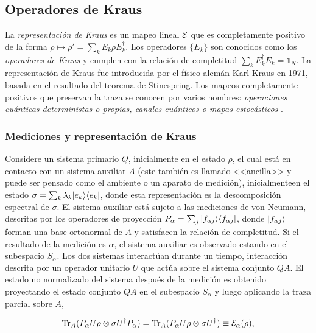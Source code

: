 \subsection{Operadores de Kraus}

 La \textit{representación de Kraus} es un mapeo lineal $\mathcal{E}$ que es completamente positivo de la forma $\rho \mapsto \rho'=\sum_k E_k\rho E_k^\dagger$. Los operadores $\{E_k\}$ son conocidos como los \textit{operadores de Kraus} y cumplen con la relación de completitud $\sum_k E_k^\dagger E_k=\mathds{1}_N$. La representación de Kraus fue introducida por el físico alemán Karl Kraus en 1971, basada en el resultado del teorema de Stinespring. Los mapeos completamente positivos que preservan la traza se conocen por varios nombres: \textit{operaciones cuánticas deterministas o propias, canales cuánticos o mapas estocásticos} {\cite{2007geometry}}.


\subsubsection{Mediciones y representación de Kraus}\label{Medicion_RepresentacionDeKraus}

Considere un sistema primario $Q$, inicialmente en el estado $\rho$,  el cual está en contacto con un sistema auxiliar $A$ (este también es llamado <<ancilla>> y puede ser pensado como el ambiente o un aparato de medición), inicialmenteen el estado $\sigma=\sum_k \lambda_k |e_k\rangle \langle e_k|$, donde esta representación es la descomposición espectral de $\sigma$. El sistema auxiliar está sujeto a las mediciones de von Neumann, descritas por los operadores de proyección $P_\alpha=\sum_j |f_{\alpha j}\rangle \langle f_{\alpha j}|$,  donde $|f_{\alpha j}\rangle$ forman una base ortonormal de $A$ y satisfacen la relación de completitud. Si el resultado de la medición es $\alpha$, el sistema auxiliar es observado estando en el subespacio $S_\alpha$. Los dos sistemas interactúan durante un tiempo, interacción descrita por un operador unitario $U$ que actúa sobre el sistema conjunto $QA$. El estado no normalizado del sistema después de la medición es obtenido proyectando el estado conjunto $QA$ en el subespacio $S_\alpha$ y luego aplicando la traza parcial sobre $A$,

\begin{equation}\label{measurement_model}
    {\rm Tr}_A(P_\alpha U \rho \otimes \sigma U^\dagger P_\alpha)= {\rm Tr}_A(P_\alpha U \rho \otimes \sigma U^\dagger)\equiv \mathcal{E}_\alpha(\rho),
\end{equation}


